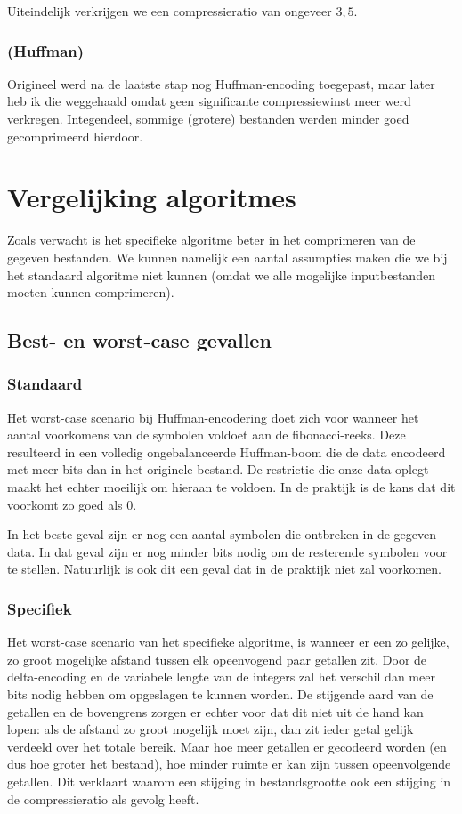 \documentclass[a4paper]{article}
\begin{document}
Uiteindelijk verkrijgen we een compressieratio van ongeveer $3,5$.

\subsubsection{(Huffman)}
Origineel werd na de laatste stap nog Huffman-encoding toegepast, maar later heb ik die weggehaald omdat geen significante compressiewinst meer werd verkregen.
Integendeel, sommige (grotere) bestanden werden minder goed gecomprimeerd hierdoor.

\section{Vergelijking algoritmes}

Zoals verwacht is het specifieke algoritme beter in het comprimeren van de gegeven bestanden. We kunnen namelijk een aantal assumpties maken die we bij het standaard algoritme niet kunnen (omdat we alle mogelijke inputbestanden moeten kunnen comprimeren).

\subsection{Best- en worst-case gevallen}
\subsubsection{Standaard}
Het worst-case scenario bij Huffman-encodering doet zich voor wanneer het aantal voorkomens van de symbolen voldoet aan de fibonacci-reeks. Deze resulteerd in een volledig ongebalanceerde Huffman-boom die de data encodeerd met meer bits dan in het originele bestand. De restrictie die onze data oplegt maakt het echter moeilijk om hieraan te voldoen. In de praktijk is de kans dat dit voorkomt zo goed als 0.

In het beste geval zijn er nog een aantal symbolen die ontbreken in de gegeven data. In dat geval zijn er nog minder bits nodig om de resterende symbolen voor te stellen. Natuurlijk is ook dit een geval dat in de praktijk niet zal voorkomen.

\subsubsection{Specifiek}
Het worst-case scenario van het specifieke algoritme, is wanneer er een zo gelijke, zo groot mogelijke afstand tussen elk opeenvogend paar getallen zit. Door de delta-encoding en de variabele lengte van de integers zal het verschil dan meer bits nodig hebben om opgeslagen te kunnen worden. De stijgende aard van de getallen en de bovengrens zorgen er echter voor dat dit niet uit de hand kan lopen: als de afstand zo groot mogelijk moet zijn, dan zit ieder getal gelijk verdeeld over het totale bereik. Maar hoe meer getallen er gecodeerd worden (en dus hoe groter het bestand), hoe minder ruimte er kan zijn tussen opeenvolgende getallen. Dit verklaart waarom een stijging in bestandsgrootte ook een stijging in de compressieratio als gevolg heeft.
\end{document}
